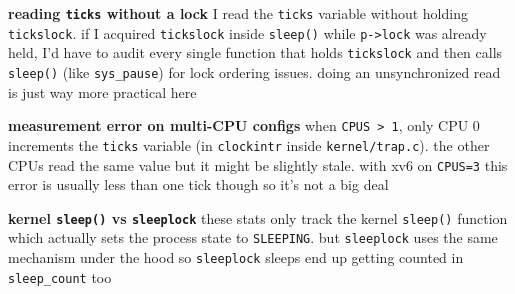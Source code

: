 \documentclass[12pt]{report}
\begin{document}
\begin{notebox}
\textbf{reading \texttt{ticks} without a lock}\quad
I read the \texttt{ticks} variable without holding \texttt{tickslock}. if I acquired \texttt{tickslock} inside \texttt{sleep()} while \texttt{p->lock} was already held, I'd have to audit every single function that holds \texttt{tickslock} and then calls \texttt{sleep()} (like \texttt{sys\_pause}) for lock ordering issues. doing an unsynchronized read is just way more practical here
\end{notebox}

\begin{notebox}
\textbf{measurement error on multi-CPU configs}\quad
when \texttt{CPUS > 1}, only CPU 0 increments the \texttt{ticks} variable (in \texttt{clockintr} inside \texttt{kernel/trap.c}). the other CPUs read the same value but it might be slightly stale. with xv6 on \texttt{CPUS=3} this error is usually less than one tick though so it's not a big deal
\end{notebox}

\begin{notebox}
\textbf{kernel \texttt{sleep()} vs \texttt{sleeplock}}\quad
these stats only track the kernel \texttt{sleep()} function which actually sets the process state to \texttt{SLEEPING}. but \texttt{sleeplock} uses the same mechanism under the hood so \texttt{sleeplock} sleeps end up getting counted in \texttt{sleep\_count} too
\end{notebox}
\end{document}

